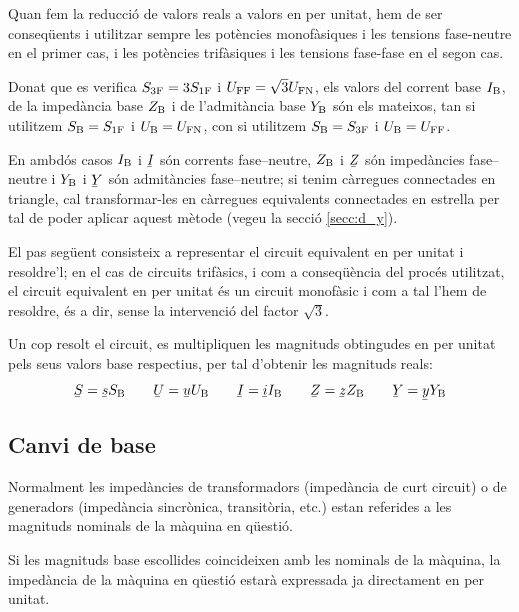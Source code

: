  Quan fem la reducci\'{o} de valors reals a valors en per unitat, hem de ser conseq\"{u}ents i utilitzar sempre les pot\`{e}ncies monof\`{a}siques i les tensions fase-neutre en el primer cas, i les pot\`{e}ncies trif\`{a}siques i les tensions fase-fase en el segon cas.

 Donat que es verifica $S_\mathrm{3F}=3 S_\mathrm{1F}$ i $U_\mathrm{FF}=\sqrt{3}U_\mathrm{FN}$, els valors  del corrent base $I_\mathrm{B}$, de la imped\`{a}ncia base $Z_\mathrm{B}$ i  de l'admit\`{a}ncia base $Y_\mathrm{B}$ s\'{o}n els mateixos, tan si utilitzem $S_\mathrm{B}=S_\mathrm{1F}$ i $U_\mathrm{B}=U_\mathrm{FN}$, con si utilitzem $S_\mathrm{B}=S_\mathrm{3F}$ i $U_\mathrm{B}=U_\mathrm{FF}$.

 En ambd\'{o}s casos $I_\mathrm{B}$ i $\cmplx{I}$ s\'{o}n corrents fase--neutre, $Z_\mathrm{B}$ i $\cmplx{Z}$ s\'{o}n imped\`{a}ncies fase--neutre i $Y_\mathrm{B}$ i $\cmplx{Y}$ s\'{o}n admit\`{a}ncies fase--neutre; si tenim c\`{a}rregues connectades en triangle, cal transformar-les en c\`{a}rregues equivalents connectades en estrella per tal de poder aplicar aquest m\`{e}tode (vegeu la secci\'{o} \ref{secc:d_y}).

El pas seg\"{u}ent consisteix a representar el circuit equivalent en
per unitat i resoldre'l; en el cas de circuits trif\`{a}sics, i com a conseq\"{u}\`{e}ncia del proc\'{e}s utilitzat, el circuit equivalent en per unitat \'{e}s un circuit monof\`{a}sic i com a tal l'hem de resoldre, \'{e}s a dir, sense la intervenci\'{o} del factor $\sqrt{3}$.

Un cop resolt el circuit, es multipliquen les magnituds obtingudes en per unitat pels
seus valors base respectius, per tal d'obtenir les magnituds reals:
\begin{equation}
   \cmplx{S} = \cmplx{s} S\ped{B} \qquad \cmplx{U} = \cmplx{u} U\ped{B} \qquad \cmplx{I} = \cmplx{i} I\ped{B} \qquad \cmplx{Z} = \cmplx{z} Z\ped{B} \qquad \cmplx{Y} = \cmplx{y} Y\ped{B}
\end{equation}

\subsection{Canvi de base}\label{sec:canvi-base} 

Normalment les imped\`{a}ncies de transformadors (imped\`{a}ncia de curt circuit) o de generadors (imped\`{a}ncia sincr\`{o}nica, transit\`{o}ria, etc.) estan referides a les magnituds nominals de la m\`{a}quina en q\"{u}esti\'{o}.


Si les magnituds base escollides coincideixen amb les nominals de la m\`{a}quina,
la imped\`{a}ncia de la m\`{a}quina en q\"{u}esti\'{o} estar\`{a} expressada ja directament en per unitat.

